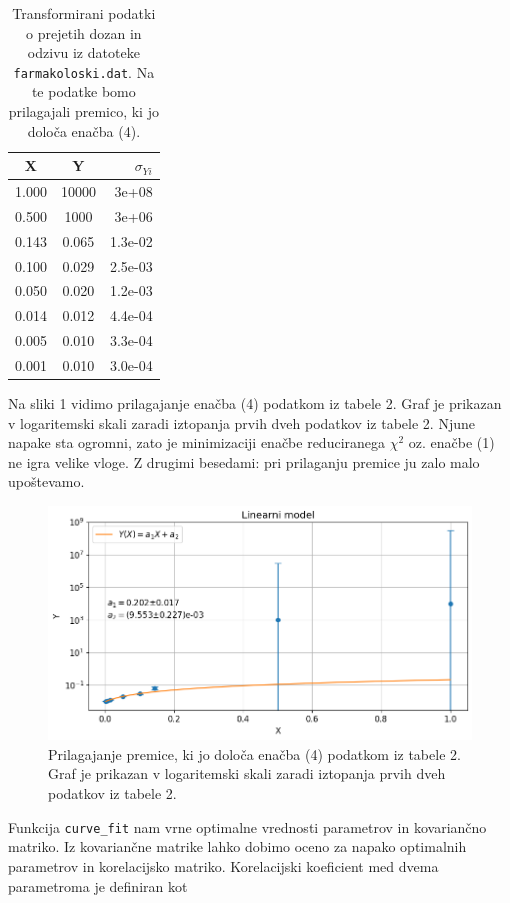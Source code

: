 \documentclass[slovene,11pt,a4paper]{article}
\begin{document}
\begin{table}[h!]
\centering
\begin{tabular}{ccr}
\toprule
    X &      Y & $\sigma_{Yi}$ \\
\midrule
1.000 &  10000 &  3e+08   \\
0.500 &   1000 &  3e+06   \\
0.143 &  0.065 &  1.3e-02 \\
0.100 &  0.029 &  2.5e-03 \\
0.050 &  0.020 &  1.2e-03 \\
0.014 &  0.012 &  4.4e-04 \\
0.005 &  0.010 &  3.3e-04 \\
0.001 &  0.010 &  3.0e-04 \\
\bottomrule
\end{tabular}
\caption{Transformirani podatki o prejetih dozan in odzivu iz datoteke \texttt{farmakoloski.dat}. Na te podatke bomo prilagajali premico, ki jo določa enačba (4).}
\end{table}
\noindent Na sliki 1 vidimo prilagajanje enačba (4) podatkom iz tabele 2. Graf je prikazan v logaritemski skali zaradi iztopanja prvih dveh podatkov iz tabele 2. Njune napake sta ogromni, zato je minimizaciji enačbe reduciranega $\chi^2$ oz. enačbe (1) ne igra velike vloge. Z drugimi besedami: pri prilaganju premice ju zalo malo upoštevamo.

\begin{figure}[h!]
\centering
\includegraphics[width=13cm]{farma1.png}
\caption{Prilagajanje premice, ki jo določa enačba (4) podatkom iz tabele 2. Graf je prikazan v logaritemski skali zaradi iztopanja prvih dveh podatkov iz tabele 2.}
\end{figure}

Funkcija \texttt{curve\_fit} nam vrne optimalne vrednosti parametrov in kovariančno matriko. Iz kovariančne matrike lahko dobimo oceno za napako optimalnih parametrov in korelacijsko matriko. Korelacijski koeficient med dvema parametroma je definiran kot
\end{document}
